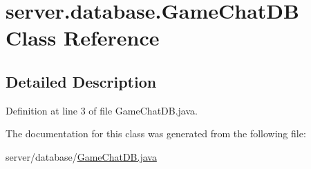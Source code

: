 \hypertarget{classserver_1_1database_1_1_game_chat_d_b}{}\section{server.\+database.\+Game\+Chat\+DB Class Reference}
\label{classserver_1_1database_1_1_game_chat_d_b}


\subsection{Detailed Description}


Definition at line 3 of file Game\+Chat\+D\+B.\+java.



The documentation for this class was generated from the following file\+:\begin{DoxyCompactItemize}
\item 
server/database/\hyperlink{_game_chat_d_b_8java}{Game\+Chat\+D\+B.\+java}\end{DoxyCompactItemize}
